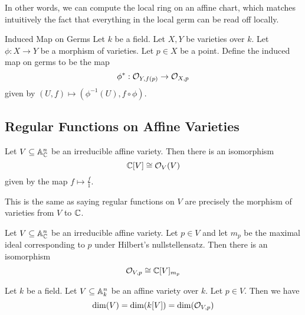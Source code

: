 \documentclass[a4paper]{article}
\begin{document}
In other words, we can compute the local ring on an affine chart, which matches intuitively the fact that everything in the local germ can be read off locally. 

\begin{defn}{Induced Map on Germs}{} Let $k$ be a field. Let $X,Y$ be varieties over $k$. Let $\phi:X\to Y$ be a morphism of varieties. Let $p\in X$ be a point. Define the induced map on germs to be the map $$\phi^\ast:\mathcal{O}_{Y,f(p)}\to\mathcal{O}_{X,p}$$ given by $(U,f)\mapsto(\phi^{-1}(U),f\circ\phi)$. 
\end{defn}

\subsection{Regular Functions on Affine Varieties}
\begin{prp}{}{} Let $V\subseteq\mathbb{A}_{\mathbb{C}}^n$ be an irreducible affine variety. Then there is an isomorphism $$\mathbb{C}[V]\cong\mathcal{O}_V(V)$$ given by the map $f\mapsto\frac{f}{1}$. 
\end{prp}

This is the same as saying regular functions on $V$ are precisely the morphism of varieties from $V$ to $\mathbb{C}$. 

\begin{prp}{}{} Let $V\subseteq\mathbb{A}_{\mathbb{C}}^n$ be an irreducible affine variety. Let $p\in V$ and let $m_p$ be the maximal ideal corresponding to $p$ under Hilbert's nullstellensatz. Then there is an isomorphism $$\mathcal{O}_{V,p}\cong\mathbb{C}[V]_{m_p}$$
\end{prp}

\begin{prp}{}{} Let $k$ be a field. Let $V\subseteq\mathbb{A}_k^n$ be an affine variety over $k$. Let $p\in V$. Then we have $$\dim(V)=\dim(k[V])=\dim(\mathcal{O}_{V,p})$$
\end{prp}
\end{document}
